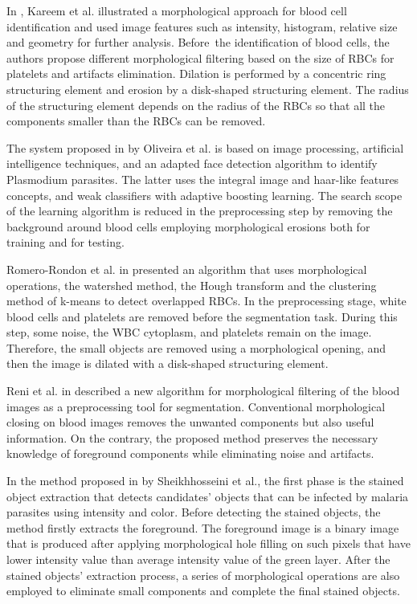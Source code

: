 In \cite{Kareem2012}, Kareem et al. illustrated a morphological approach for blood cell identification and used image features such as intensity, histogram, relative size and geometry for further analysis. Before~the identification of blood cells, the authors propose different morphological filtering based on the size of RBCs for platelets and artifacts elimination. Dilation is performed by a concentric ring structuring element and erosion by a disk-shaped structuring element. The radius of the structuring element depends on the radius of the RBCs so that all the components smaller than the RBCs can be removed.

The system proposed in \cite{Oliveira2017} by Oliveira et al. is based on image processing, artificial intelligence techniques, and an adapted face detection algorithm to identify Plasmodium parasites. The latter uses the integral image and haar-like features concepts, and weak classifiers with adaptive boosting learning. The search scope of the learning algorithm is reduced in the preprocessing step by removing the background around blood cells employing morphological erosions both for training and for testing.

Romero-Rondon et al. in \cite{Romero2016} presented an algorithm that uses morphological operations, the watershed method, the Hough transform and the clustering method of k-means to detect overlapped RBCs. In the preprocessing stage, white blood cells and platelets are removed before the segmentation task. During this step, some noise, the WBC cytoplasm, and platelets remain on the image. 
Therefore, the small objects are removed using a morphological opening, and then the image is dilated with a disk-shaped structuring element.

Reni et al. in \cite{Reni2015} described a new algorithm for morphological filtering of the blood images as a preprocessing tool for segmentation. Conventional morphological closing on blood images removes the unwanted components but also useful information. On the contrary, the proposed method preserves the necessary knowledge of foreground components while eliminating noise and artifacts.

In the method proposed in \cite{Sheik2013} by Sheikhhosseini et al., the first phase is the stained object extraction that detects candidates' objects that can be infected by malaria parasites using intensity and color. Before detecting the stained objects, the method firstly extracts the foreground. The foreground image is a binary image that is produced after applying morphological hole filling on such pixels that have lower intensity value than average intensity value of the green layer. After the stained objects' extraction process, a series of morphological operations are also employed to eliminate small components and complete the final stained objects.

